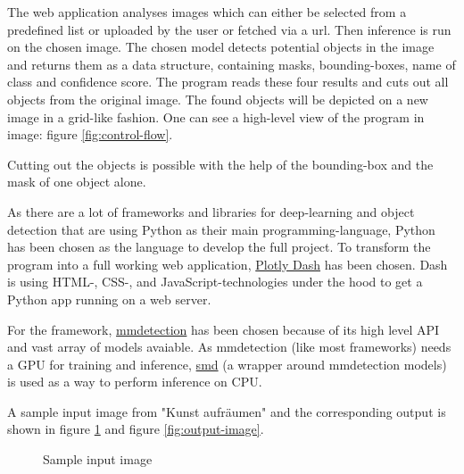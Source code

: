 \documentclass[a4paper,10pt,hidelinks]{scrartcl}
\newcommand{\imgref}[1]{{figure \ref{#1}}}
\begin{document}
The web application analyses images which can either be selected from a predefined list or uploaded by the user or fetched via a url. Then inference is run on the chosen image. The chosen model detects potential objects in the image and returns them as a data structure, containing masks, bounding-boxes, name of class and confidence score. \newline The program reads these four results and cuts out all objects from the original image. The found objects will be depicted on a new image in a grid-like fashion. One can see a high-level view of the program in image: \imgref{fig:control-flow}.

Cutting out the objects is possible with the help of the bounding-box and the mask of one object alone.

As there are a lot of frameworks and libraries for deep-learning and object detection that are using Python as their main programming-language, Python has been chosen as the language to develop the full project. To transform the program into a full working web application, \href{https://dash.plotly.com}{Plotly Dash} has been chosen. Dash is using HTML-, CSS-, and JavaScript-technologies under the hood to get a Python app running on a web server.

For the framework, \href{https://github.com/open-mmlab/mmdetection/}{mmdetection} has been chosen because of its high level API and vast array of models avaiable. As mmdetection (like most frameworks) needs a GPU for training and inference, \href{https://github.com/akarazniewicz/smd}{smd} (a wrapper around mmdetection models) is used as a way to perform inference on CPU.

A sample input image from "Kunst aufräumen" and the corresponding output is shown in \imgref{fig:input-image} and \imgref{fig:output-image}.

\begin{figure}[!h]
	\caption{\label{fig:input-image} Sample input image}
\end{figure}
\end{document}
